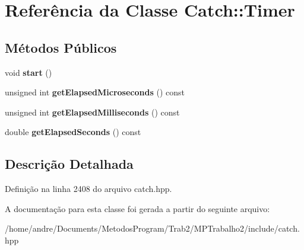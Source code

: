 \hypertarget{classCatch_1_1Timer}{}\section{Referência da Classe Catch\+:\+:Timer}
\label{classCatch_1_1Timer}
\subsection*{Métodos Públicos}
\begin{DoxyCompactItemize}
\item 
void {\bfseries start} ()\hypertarget{classCatch_1_1Timer_a0a56e879e43f36c102bf9ea8b5fc8b72}{}\label{classCatch_1_1Timer_a0a56e879e43f36c102bf9ea8b5fc8b72}

\item 
unsigned int {\bfseries get\+Elapsed\+Microseconds} () const \hypertarget{classCatch_1_1Timer_a4b0062f169f7d3150b0e8073ab37890a}{}\label{classCatch_1_1Timer_a4b0062f169f7d3150b0e8073ab37890a}

\item 
unsigned int {\bfseries get\+Elapsed\+Milliseconds} () const \hypertarget{classCatch_1_1Timer_a4cf3f9fbee9c76e87d989d9bc6913b68}{}\label{classCatch_1_1Timer_a4cf3f9fbee9c76e87d989d9bc6913b68}

\item 
double {\bfseries get\+Elapsed\+Seconds} () const \hypertarget{classCatch_1_1Timer_a8500ef3481a9bf6ae81337972d9f95a3}{}\label{classCatch_1_1Timer_a8500ef3481a9bf6ae81337972d9f95a3}

\end{DoxyCompactItemize}


\subsection{Descrição Detalhada}


Definição na linha 2408 do arquivo catch.\+hpp.



A documentação para esta classe foi gerada a partir do seguinte arquivo\+:\begin{DoxyCompactItemize}
\item 
/home/andre/\+Documents/\+Metodos\+Program/\+Trab2/\+M\+P\+Trabalho2/include/catch.\+hpp\end{DoxyCompactItemize}
